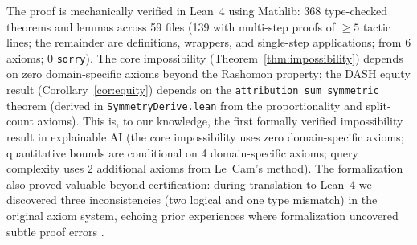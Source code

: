 \documentclass{article}
\begin{document}
\begin{sloppypar}
The proof is mechanically verified in Lean~4 using Mathlib: 368 type-checked theorems
and lemmas across 59 files (139 with multi-step proofs of ${\geq}5$ tactic lines; the
remainder are definitions, wrappers, and single-step applications; from 6
axioms; 0 \texttt{sorry}).
The core impossibility (Theorem~\ref{thm:impossibility}) depends on zero domain-specific axioms
beyond the Rashomon property; the DASH equity result (Corollary~\ref{cor:equity})
depends on the \texttt{attribution\_sum\_symmetric} theorem (derived in
\texttt{SymmetryDerive.lean} from the proportionality and split-count axioms).
This is, to our knowledge, the first formally verified impossibility result in
explainable AI (the core impossibility uses zero domain-specific axioms; quantitative bounds are
conditional on 4 domain-specific axioms; query complexity uses 2 additional axioms
from Le~Cam's method).
The formalization also proved valuable beyond certification: during translation to
Lean~4 we discovered three inconsistencies (two logical and one type mismatch) in the
original axiom system, echoing prior experiences where formalization uncovered subtle
proof errors \citep{nipkow2009social,zhang2026statistical}.
\end{sloppypar}
\end{document}
